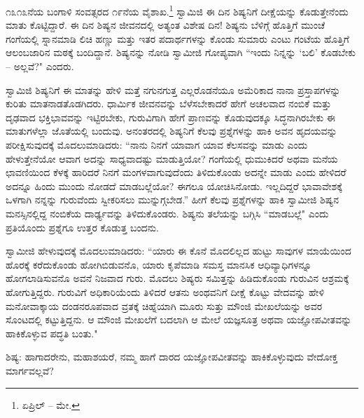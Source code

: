 ೧೩೧೩ನೆಯ ಬಂಗಾಳಿ ಸಂವತ್ಸರದ ೧೯ನೆಯ ವೈಶಾಖ.\footnote{ಏಪ್ರಿಲ್ – ಮೇ.} ಸ್ವಾಮಿಜಿ ಈ ದಿನ ಶಿಷ್ಯನಿಗೆ ದೀಕ್ಷೆಯನ್ನು ಕೊಡುತ್ತೇನೆಂದು ಮಾತು ಕೊಟ್ಟಿದ್ದಾರೆ. ಈ ದಿನ ಶಿಷ್ಯನ ಜೀವನದಲ್ಲಿ ಅತ್ಯಂತ ವಿಶೇಷ ದಿನ! ಶಿಷ್ಯನು ಬೆಳಿಗ್ಗೆ ಹೊತ್ತಿಗೆ ಮುಂಚೆ ಗಂಗೆಯಲ್ಲಿ ಸ್ನಾನಮಾಡಿ ಲಿಚಿ ಹಣ್ಣು ಮತ್ತು ಇತರ ಪದಾರ್ಥಗಳನ್ನು ಕೊಂಡು ಸುಮಾರು ಎಂಟು ಗಂಟೆಯ ಹೊತ್ತಿಗೆ ಆಲಂಬಜಾರಿನ ಮಠಕ್ಕೆ ಬಂದಿದ್ದಾನೆ. ಶಿಷ್ಯನನ್ನು ನೋಡಿ ಸ್ವಾಮೀಜಿ ಗೋಪ್ಯವಾಗಿ “ಇಂದು ನಿನ್ನನ್ನು ‘ಬಲಿ’ ಕೊಡಬೇಕು – ಅಲ್ಲವೆ?" ಎಂದರು.

ಸ್ವಾಮಿಜಿ ಶಿಷ್ಯನಿಗೆ ಈ ಮಾತನ್ನು ಹೇಳಿ ಮತ್ತೆ ನಗುನಗುತ್ತ ಎಲ್ಲರೊಡನೆಯೂ ಅಮೆರಿಕಾದ ನಾನಾ ಪ್ರಸ್ತಾಪಗಳನ್ನು ಕುರಿತು ಮಾತನಾಡತೊಡಗಿದರು. ಧಾರ್ಮಿಕ ಜೀವನವನ್ನು ಬೆಳೆಸಬೇಕಾದರೆ ಹೇಗೆ ಅಚಲವಾದ ನಂಬಿಕೆ ಮತ್ತು ದೃಢವಾದ ಭಕ್ತಿಭಾವವನ್ನು ಇಟ್ಟಿರಬೇಕು, ಗುರುವಿಗಾಗಿ ಹೇಗೆ ಪ್ರಾಣವನ್ನು ಕೊಡುವುದಕ್ಕೂ ಸಿದ್ಧನಾಗಿರಬೇಕು ಈ ಮಾತುಗಳೆಲ್ಲಾ ಜೊತೆಯಲ್ಲಿ ಬಂದುವು. ಅನಂತರದಲ್ಲಿ ಶಿಷ್ಯನಿಗೆ ಕೆಲವು ಪ್ರಶ್ನೆಗಳನ್ನು ಹಾಕಿ ಅವನ ಹೃದಯವನ್ನು ಪರೀಕ್ಷಿಸುವುದಕ್ಕೆ ಮೊದಲುಮಾಡಿದರು: “ನಾನು ನಿನಗೆ ಯಾವಾಗ ಯಾವ ಕೆಲಸವನ್ನು ಮಾಡು ಎಂದು ಹೇಳುತ್ತೇನೆಯೋ ಆವಾಗ ಅದನ್ನು ಸಾಧ್ಯವಾದಷ್ಟು ಮಾಡುತ್ತಿಯೋ? ಗಂಗೆಯಲ್ಲಿ ಧುಮುಕಿದರೆ ಅಥವಾ ಮನೆಯ ಛಾವಣಿಯಿಂದ ಕೆಳಕ್ಕೆ ಹಾರಿದರೆ ನಿನಗೆ ಮಂಗಳವಾಗುವುದೆಂದು ತಿಳಿದುಕೊಂಡು ಅದನ್ನೇ ಮಾಡು ಎಂದು ಹೇಳಿದರೆ ಅದನ್ನೂ ಹಿಂದು ಮುಂದು ನೋಡದೆ ಮಾಡಬಲ್ಲೆಯೋ? ಈಗಲೂ ಯೋಚಿಸಿನೋಡು. ಇಲ್ಲದಿದ್ದರೆ ಭಾವಾವೇಶಕ್ಕೆ ಒಳಗಾಗಿ ನನ್ನನ್ನು ಗುರುವೆಂದು ಸ್ವೀಕರಿಸಲು ಮುನ್ನುಗ್ಗಬೇಡ.” ಹೀಗೆ ಕೆಲವು ಪ್ರಶ್ನೆಗಳನ್ನು ಹಾಕಿ ಸ್ವಾಮೀಜಿ ಶಿಷ್ಯನ ಮನಸ್ಸಿನಲ್ಲಿದ್ದ ನಂಬಿಕೆಯ ದಾರ್ಢ್ಯವನ್ನು ತಿಳಿದುಕೊಂಡರು. ಶಿಷ್ಯನು ತಲೆಯನ್ನು ಬಗ್ಗಿಸಿ “ಮಾಡಬಲ್ಲೆ" ಎಂದು ಪ್ರತಿಯೊಂದು ಪ್ರಶ್ನೆಗೂ ಉತ್ತರ ಕೊಡುತ್ತ ಬಂದನು.

ಸ್ವಾಮೀಜಿ ಹೇಳುವುದಕ್ಕೆ ಮೊದಲುಮಾಡಿದರು: “ಯಾರು ಈ ಕೊನೆ ಮೊದಲಿಲ್ಲದ ಹುಟ್ಟು ಸಾವುಗಳ ಮಾಯೆಯಿಂದ ಹೊರಕ್ಕೆ ಕರೆದುಕೊಂಡು ಹೋಗಿಬಿಡುವನೊ, ಯಾರು ಕೃಪೆಮಾಡಿ ಸಮಸ್ತ ಮಾನಸಿಕ ಆಧಿವ್ಯಾಧಿಗಳನ್ನೂ ಹೋಗಲಾಡಿಸುವನೊ ಅವನೆ ನಿಜವಾದ ಗುರು. ಮೊದಲು ಶಿಷ್ಯರು ಸಮಿತ್ತನ್ನು ಹಿಡಿದುಕೊಂಡು ಗುರುವಿನ ಆಶ್ರಮಕ್ಕೆ ಹೋಗುತ್ತಿದ್ದರು. ಗುರುವಿಗೆ ಅಧಿಕಾರಿಯೆಂದು ತಿಳಿದರೆ ಆತನು ಅಂಥವನಿಗೆ ದೀಕ್ಷೆ ಕೊಟ್ಟು ವೇದವನ್ನು ಹೇಳಿ ಮನೋವಾಕ್ಕಾಯ ದಂಡನರೂಪವಾದ ವ್ರತಕ್ಕೆ ಚಿಹ್ನೆಯಾಗಿ ಮೂರು ಸುತ್ತು ಮೌಂಜಿ ಮೇಖಲೆಯನ್ನು ಅವರ ಸೊಂಟದಲ್ಲಿ ಕಟ್ಟುತ್ತಿದ್ದನು. ಆ ಮೌಂಜಿ ಮೇಖಲೆಗೆ ಬದಲಾಗಿ ಆ ಮೇಲೆ ಯಜ್ಞಸೂತ್ರ ಅಥವಾ ಯಜ್ಞೋಪವೀತವನ್ನು ಹಾಕಿಕೊಳ್ಳುವ ಪದ್ಧತಿ ಬಂತು."

ಶಿಷ್ಯ: ಹಾಗಾದರೇನು, ಮಹಾಶಯರೆ, ನಮ್ಮ ಹಾಗೆ ದಾರದ ಯಜ್ಞೋಪವೀತವನ್ನು ಹಾಕಿಕೊಳ್ಳುವುದು ವೇದೋಕ್ತ ಮಾರ್ಗವಲ್ಲವೆ?

